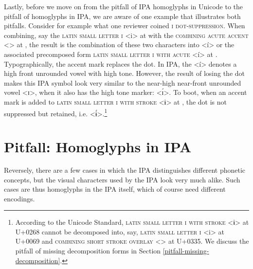 Lastly, before we move on from the pitfall of IPA homoglyphs in Unicode to the pitfall of 
homoglyphs in IPA, we are aware of one example that illustrates both pitfalls. 
Consider for example what one reviewer coined \textsc{i dot-suppression}. 
When combining, say the \textsc{latin small letter i} <i> at  with 
the \textsc{combining acute accent} <> at , the result is 
 the combination of these two characters into <í> or the associated 
precomposed form \textsc{latin small letter i with acute} <í> at . 
Typographically, the accent mark replaces the dot. In IPA, the <í> denotes 
a high front unrounded vowel with high tone. However, the result of losing 
the dot makes this IPA symbol look very similar to the near-high near-front 
unrounded vowel <ɪ>, when it also has the high tone marker: <ɪ́>. To boot, 
when an accent mark is added to \textsc{latin small letter i with stroke} <ɨ> at 
, the dot is not suppressed but retained, i.e. <ɨ́>.\footnote{According 
to the Unicode Standard, \textsc{latin small letter i with stroke} <ɨ> at 
U+0268 cannot be decomposed into, say, \textsc{latin small letter i} <i> at 
U+0069 and \textsc{combining short stroke overlay} <> at U+0335. 
We discuss the pitfall of missing decomposition forms 
in Section \ref{pitfall-missing-decomposition}.}


\section{Pitfall: Homoglyphs in IPA}
\label{pitfall-homoglyphs-in-IPA}

Reversely, there are a few cases in which the IPA distinguishes different
phonetic concepts, but the visual characters used by the IPA look very much
alike. Such cases are thus homoglyphs in the IPA itself, which of course need
different encodings.

